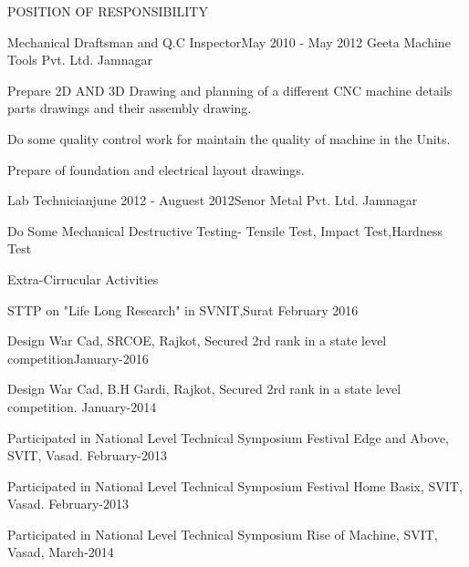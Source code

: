 \documentclass{resume} %
\begin{document}
\begin{rSection}{POSITION OF RESPONSIBILITY}

\begin{rSubsection}{Mechanical Draftsman and Q.C Inspector}{May 2010 - May 2012} {Geeta Machine Tools Pvt. Ltd. Jamnagar} {} 
\item Prepare 2D AND 3D Drawing and planning of a different CNC machine details
parts drawings and their assembly drawing.
\item Do some quality control work for maintain the quality of machine in the Units.
\item Prepare of foundation and electrical layout drawings.
\end{rSubsection}



\begin{rSubsection}{Lab Technician}{june 2012 - Auguest 2012}{Senor Metal Pvt. Ltd. Jamnagar} {}
 \item Do Some Mechanical Destructive Testing- Tensile Test, Impact Test,Hardness Test
\end{rSubsection}
 
\end{rSection}

\begin{rSection}{Extra-Cirrucular Activities} \itemsep -1pt {}   
\item STTP on "Life Long Research" in SVNIT,Surat \hfill February 2016
\item Design War Cad, SRCOE, Rajkot, Secured 2rd rank in a state level competition\hfill January-2016
\item  Design War Cad, B.H Gardi, Rajkot, Secured 2rd rank in a
state level competition. \hfill January-2014 
\item Participated in National Level Technical Symposium Festival Edge and Above, SVIT, Vasad. \hfill February-2013
\item Participated in National Level Technical Symposium Festival Home Basix, SVIT, Vasad.
 \hfill  February-2013 
\item Participated in National Level Technical Symposium Rise of Machine, SVIT, Vasad,  \hfill March-2014 
 

\end{rSection}
\fi
\end{document}
